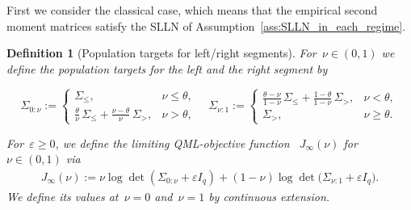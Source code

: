 \documentclass[10pt, letterpaper]{amsart}
\newif\ifwidedisplays
\newtheorem{defn}[theorem]{Definition}
\begin{document}
First we consider the classical case, which means that the empirical second moment matrices satisfy the SLLN of Assumption~\ref{ass:SLLN_in_each_regime}.
\begin{defn}[Population targets for left/right segments]\label{def:population_targets}
For~$\nu \in (0,1)$ we define the population targets for the left and the right segment by
\ifwidedisplays
\[
\Sigma_{0: \nu}
:=
\begin{cases}
\Sigma_{\le}, & \nu \le \theta,\\[4pt]
\frac{\theta}{\nu}\,\Sigma_{\le}
+\frac{\nu-\theta}{\nu}\,\Sigma_{>}, & \nu > \theta,
\end{cases}
\qquad
\Sigma_{\nu:1}
:=
\begin{cases}
\frac{\theta-\nu}{1-\nu}\,\Sigma_{\le}
+\frac{1-\theta}{1-\nu}\,\Sigma_{>}, & \nu < \theta,\\[4pt]
\Sigma_{>}, & \nu \ge \theta.
\end{cases}
\]
\else
\[
\Sigma_{0: \nu}
:=
\begin{cases}
\Sigma_{\le}, & \nu \le \theta,\\[6pt]
\displaystyle
\frac{\theta}{\nu}\,\Sigma_{\le}
+\frac{\nu-\theta}{\nu}\,\Sigma_{>}, & \nu > \theta,
\end{cases}
\quad
\Sigma_{\nu:1}
:=
\begin{cases}
\displaystyle
\frac{\theta-\nu}{1-\nu}\,\Sigma_{\le}
+\frac{1-\theta}{1-\nu}\,\Sigma_{>}, & \nu < \theta,\\[6pt]
\Sigma_{>}, & \nu \ge \theta.
\end{cases}
\]
\fi
     For~$\varepsilon \geq 0$, we define the limiting QML-objective function ~$J_\infty (\nu)$ for~$\nu \in (0, 1)$ via
 \begin{align}
  J_{\infty}(\nu)
  := \nu \log\det\left( \Sigma_{0: \nu} + \varepsilon I_q \right)
   + (1- \nu) \log\det\big(  \Sigma_{\nu :1}+ \varepsilon I_q\big).
 \end{align}
We define its values at~$\nu=0$ and~$\nu=1$ by continuous extension.
\end{defn}
\end{document}
